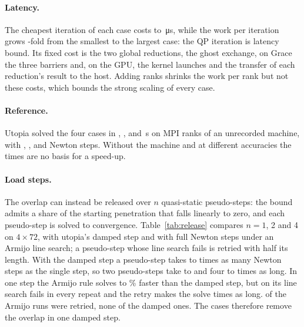 \documentclass[sigconf,nonacm]{acmart}
\begin{document}
\paragraph{Latency.} The cheapest iteration of each case costs \itBestMin{} to
\itBestMax\,\si{\micro\second}, while the work per iteration grows \dofsRatio-fold from the smallest
to the largest case: the QP iteration is latency bound. Its fixed cost is the two global reductions, the
ghost exchange, on Grace the three barriers and, on the GPU, the kernel launches and the transfer of each reduction's result to
the host. Adding ranks shrinks the work per rank but not these costs, which bounds the strong
scaling of every case.

\paragraph{Reference.} Utopia solved the four cases in \utopiaTimeFPc, \utopiaTimeFFc,
\utopiaTimeFPf{} and \utopiaTimeFFf\,\si{\second} on \utopiaRanks{} MPI ranks of an unrecorded
machine, with \utopiaNewtonFPc, \utopiaNewtonFFc, \utopiaNewtonFPf{} and \utopiaNewtonFFf{} Newton
steps. Without the machine and at different accuracies the times are no basis for a speed-up.

\paragraph{Load steps.} The overlap can instead be released over $n$ quasi-static pseudo-steps:
the bound admits a share of the starting penetration that falls linearly to zero, and each
pseudo-step is solved to convergence. Table~\ref{tab:release} compares $n=1$, 2 and 4 on
$4\times72$, with utopia's damped step and with full Newton steps under an Armijo line search; a
pseudo-step whose line search fails is retried with half its length. With the damped step a
pseudo-step takes \releasePerStepMin{} to \releasePerStepMax{} times as many Newton steps as the
single step, so two pseudo-steps take \releaseTwoMin{} to \releaseTwoMax{} and four
\releaseFourMin{} to \releaseFourMax{} times as long. In one step the Armijo rule solves
\armijoFasterCases{} \armijoGainMin{} to \armijoGainMax\% faster than the damped step, but on
\armijoCutbackCase{} its line search fails in every repeat and the retry makes the solve
\armijoCutbackSlower{} times as long. \armijoCutbackRuns{} of the \armijoRuns{} Armijo runs were
retried, none of the damped ones. The cases therefore remove the overlap in one damped step.
\end{document}
